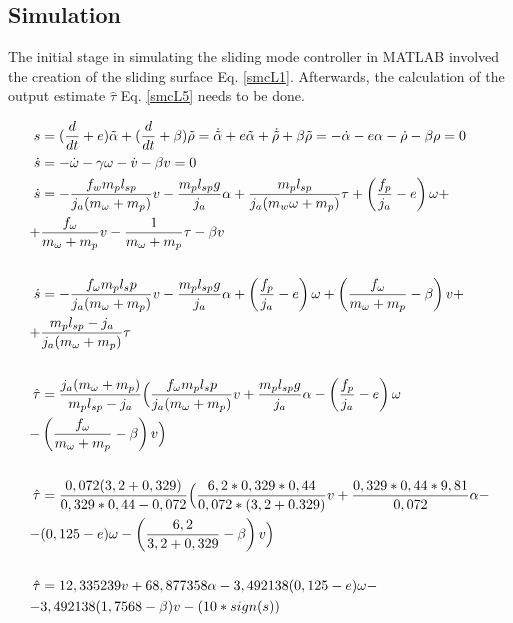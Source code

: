 \subsection{Simulation}

The initial stage in simulating the sliding mode controller in MATLAB involved the creation of the sliding surface Eq. \ref{smcL1}. Afterwards, the calculation of the output estimate $\hat{\tau }$ Eq. \ref{smcL5} needs to be done. 

\begin{align}
s &= (\frac{d}{dt}+e)\tilde{\alpha }+(\frac{d}{dt}+\beta )\tilde{\rho}=\dot{\tilde{\alpha }}+e\tilde{\alpha }+\dot{\tilde{\rho }}+\beta \tilde{\rho }=-\dot{\alpha }-e\alpha -\dot{\rho }-\beta \rho =0 \label{smcL1}\\
\dot{s} &=-\dot{\omega }-\gamma\omega -\dot{v}-\beta v=0 \label{smcL2}\\
\dot{s} &=-\frac{f_w m_p l_{sp}}{j_a(m_\omega + m_p)}v -\frac{m_p l_{sp} g}{j_a}\alpha +\frac{m_p l_{sp}}{j_a(m_w\omega+m_p)}\tau +\left(\frac{f_p}{j_a}-e\right)\omega +\nonumber\\ 
+ &\frac{f_\omega}{m_\omega+m_p}v-\frac{1}{m_\omega+m_p}\tau -\beta v  \nonumber\\
&\nonumber\\
\dot{s} &=-\frac{f_\omega m_p l_sp}{j_a (m_\omega+m_p)}v -\frac{m_p l_{sp} g}{j_a}\alpha + \left (\frac{f_p}{j_a}-e\right )\omega + \left(\frac{f_\omega}{m_\omega+m_p}-\beta\right)v + \nonumber\\
+ &\frac{m_p l_{sp}-j_a}{j_a(m_\omega+m_p)}\tau  \nonumber\\
&\nonumber\\
\hat{\tau } &=\frac{j_a(m_\omega +m_p)}{m_p l_{sp}-j_a} \Bigl( \frac{f_\omega m_p l_sp}{j_a (m_\omega+m_p)}v + \frac{m_p l_{sp} g}{j_a}\alpha - \left(\frac{f_p}{j_a}-e\right)\omega  \label{smcL5}\\
-&\left(\frac{f_\omega}{m_\omega + m_p}-\beta \right)v\Bigr) \nonumber\\
&\nonumber\\
\hat{\tau } &= \frac{0,072(3,2+0,329)}{0,329*0,44-0,072}\Bigl(\frac{6,2*0,329*0,44}{0,072*(3,2+0.329)}v + \frac{0,329*0,44*9,81}{0,072}\alpha -\nonumber\\
-&(0,125-e)\omega - \left(\frac{6,2}{3,2+0,329}-\beta\right)v \Bigr) \nonumber\\
&\nonumber\\
\hat{\tau } &=12,335239v+68,877358\alpha -3,492138(0,125-e)\omega - \label{smcL6}\\
-& 3,492138(1,7568-\beta )v - (10*sign(s)) \nonumber
\end{align}

